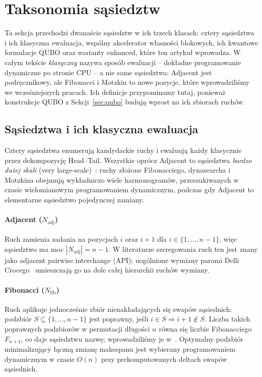 \documentclass[11pt,a4paper]{article}
\begin{document}
\section{Taksonomia sąsiedztw}
\label{sec:neighborhoods}

Ta sekcja przechodzi dwanaście sąsiedztw w ich trzech klasach: cztery
sąsiedztwa i ich klasyczna ewaluacja, wspólny akcelerator własności
blokowych, ich kwantowe formulacje QUBO oraz warianty enhanced, które
ten artykuł wprowadza. W całym tekście \emph{klasyczny} nazywa sposób
ewaluacji -- dokładne programowanie dynamiczne po stronie CPU -- a nie
same sąsiedztwa: Adjacent jest podręcznikowy, ale Fibonacci i Motzkin
to nowe pozycje, które wprowadziliśmy we wcześniejszych pracach. Ich
definicje przypominamy tutaj, ponieważ konstrukcje QUBO
z Sekcji~\ref{sec:qubo} budują wprost na ich zbiorach ruchów.

\subsection{Sąsiedztwa i ich klasyczna ewaluacja}

Cztery sąsiedztwa enumerują kandydackie ruchy i ewaluują każdy
klasycznie przez dekompozycję Head--Tail. Wszystkie oprócz Adjacent to
sąsiedztwa \emph{bardzo dużej skali} (very large-scale)~\citep{ahuja2002}:
ruchy złożone Fibonacciego, dynasearcha i Motzkina obejmują wykładniczo
wiele harmonogramów, przeszukiwanych w czasie wielomianowym
programowaniem dynamicznym, podczas gdy Adjacent to elementarne
sąsiedztwo pojedynczej zamiany.

\paragraph{Adjacent \textup{($N_{\mathrm{adj}}$)}}
Ruch zamienia zadania na pozycjach $i$ oraz $i+1$ dla
$i\in\{1,\ldots,n-1\}$, więc sąsiedztwo ma moc
$|N_{\mathrm{adj}}|=n-1$. W literaturze szeregowania ruch ten jest
znany jako adjacent pairwise interchange (API); uogólnione wymiany
parami Delli Crocego~\citep{dellacroce95} umieszczają go na dole całej
hierarchii ruchów wymiany.

\paragraph{Fibonacci \textup{($N_{\mathrm{fib}}$)}}
Ruch aplikuje jednocześnie zbiór nienakładających się swapów
sąsiednich: podzbiór $S\subseteq\{1,\ldots,n-1\}$ jest poprawny, jeśli
$i\in S \Rightarrow i+1\notin S$. Liczba takich poprawnych podzbiorów
w permutacji długości $n$ równa się liczbie Fibonacciego $F_{n+1}$, co
daje sąsiedztwu nazwę; wprowadziliśmy je
w~\citep{WojewodzkiBozejko2026}. Optymalny podzbiór minimalizujący
łączną zmianę makespanu jest wybierany programowaniem dynamicznym
w czasie $O(n)$ przy prekomputowanych deltach swapów sąsiednich.
\end{document}
